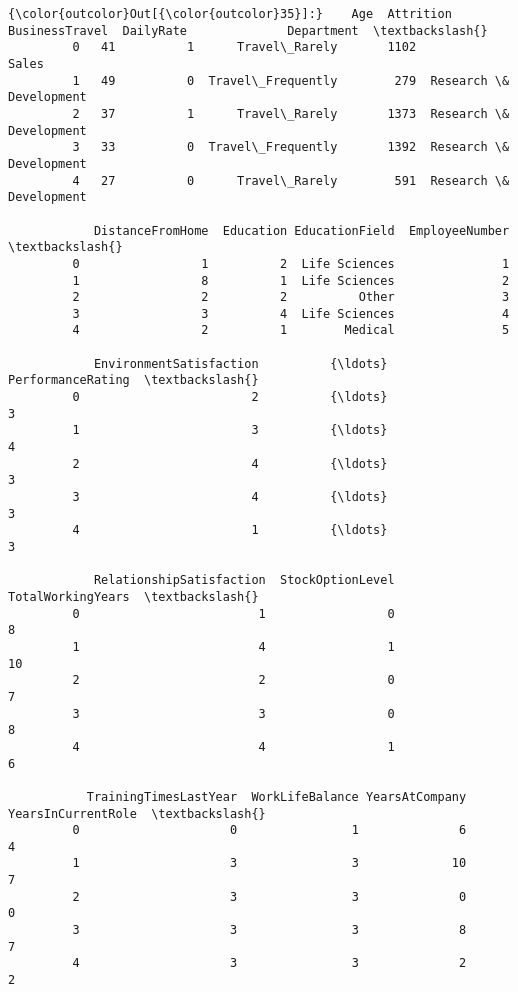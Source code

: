 \documentclass[11pt]{article}
\begin{document}
\begin{Verbatim}[commandchars=\\\{\}]
{\color{outcolor}Out[{\color{outcolor}35}]:}    Age  Attrition     BusinessTravel  DailyRate              Department  \textbackslash{}
         0   41          1      Travel\_Rarely       1102                   Sales   
         1   49          0  Travel\_Frequently        279  Research \& Development   
         2   37          1      Travel\_Rarely       1373  Research \& Development   
         3   33          0  Travel\_Frequently       1392  Research \& Development   
         4   27          0      Travel\_Rarely        591  Research \& Development   
         
            DistanceFromHome  Education EducationField  EmployeeNumber  \textbackslash{}
         0                 1          2  Life Sciences               1   
         1                 8          1  Life Sciences               2   
         2                 2          2          Other               3   
         3                 3          4  Life Sciences               4   
         4                 2          1        Medical               5   
         
            EnvironmentSatisfaction          {\ldots}          PerformanceRating  \textbackslash{}
         0                        2          {\ldots}                          3   
         1                        3          {\ldots}                          4   
         2                        4          {\ldots}                          3   
         3                        4          {\ldots}                          3   
         4                        1          {\ldots}                          3   
         
            RelationshipSatisfaction  StockOptionLevel  TotalWorkingYears  \textbackslash{}
         0                         1                 0                  8   
         1                         4                 1                 10   
         2                         2                 0                  7   
         3                         3                 0                  8   
         4                         4                 1                  6   
         
           TrainingTimesLastYear  WorkLifeBalance YearsAtCompany  YearsInCurrentRole  \textbackslash{}
         0                     0                1              6                   4   
         1                     3                3             10                   7   
         2                     3                3              0                   0   
         3                     3                3              8                   7   
         4                     3                3              2                   2   
         

\end{Verbatim}
\end{document}
